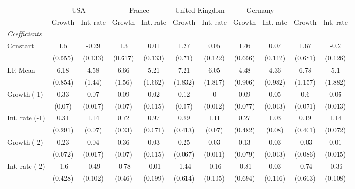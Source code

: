 \begin{table}[htbp] 
	\centering
	 \scriptsize
	\begin{tabular}{@{\extracolsep{4pt}}lcccccccccc@{}}		\hline\hline
		 		 & \multicolumn{2}{c}{USA} &\multicolumn{2}{c}{France} &\multicolumn{2}{c}{United Kingdom} &\multicolumn{2}{c}{Germany} \\ 
 		 & Growth 	 & Int. rate 	 & Growth 	 & Int. rate 	 & Growth 	 & Int. rate 	 & Growth 	 & Int. rate 	 & Growth 	 & Int. rate\\\cline{2-3}\cline{4-5}\cline{6-7}\cline{8-9}\cline{10-11}
\rule{0pt}{4ex} 
 \emph{Coefficients} 	  		 & 		 & 		 & 		 & 		 & 		 & 		 & 		 & 		 & 		 &\\ 
\quad Constant 	 & 1.5 	 & -0.29 	 & 1.3 	 & 0.01 	 & 1.27 	 & 0.05 	 & 1.46 	 & 0.07 	 & 1.67 	 & -0.2	 \\ 
 		 & (0.555) 	 & (0.133) 	 & (0.617) 	 & (0.133) 	 & (0.71) 	 & (0.122) 	 & (0.656) 	 & (0.112) 	 & (0.681) 	 & (0.126) 	 \\ 
\quad LR Mean 	 & 6.18 	 & 4.58 	 & 6.66 	 & 5.21 	 & 7.21 	 & 6.05 	 & 4.48 	 & 4.36 	 & 6.78 	 & 5.1	 \\ 
 		 & (0.854) 	 & (1.44) 	 & (1.56) 	 & (1.662) 	 & (1.832) 	 & (1.817) 	 & (0.906) 	 & (0.982) 	 & (1.157) 	 & (1.882) 	 \\ 
\quad Growth (-1) 	 &0.33 	 & 0.07 	 & 0.09 	 & 0.02 	 & 0.12 	 & 0 	 & 0.09 	 & 0.05 	 & 0.6 	 & 0.06	 \\ 
 		 & (0.07) 	 & (0.017) 	 & (0.07) 	 & (0.015) 	 & (0.07) 	 & (0.012) 	 & (0.077) 	 & (0.013) 	 & (0.071) 	 & (0.013) 	 \\ 
\quad Int. rate (-1) 	 &0.31 	 & 1.14 	 & 0.72 	 & 0.97 	 & 0.89 	 & 1.11 	 & 0.27 	 & 1.03 	 & 0.19 	 & 1.14	 \\ 
 		 & (0.291) 	 & (0.07) 	 & (0.33) 	 & (0.071) 	 & (0.413) 	 & (0.07) 	 & (0.482) 	 & (0.08) 	 & (0.401) 	 & (0.072) 	 \\ 
\quad Growth (-2) 	 &0.23 	 & 0.04 	 & 0.36 	 & 0.03 	 & 0.25 	 & 0.03 	 & 0.13 	 & 0.03 	 & -0.03 	 & 0.01	 \\ 
 		 & (0.072) 	 & (0.017) 	 & (0.07) 	 & (0.015) 	 & (0.067) 	 & (0.011) 	 & (0.079) 	 & (0.013) 	 & (0.086) 	 & (0.015) 	 \\ 
\quad Int. rate (-2) 	 &-1.6 	 & -0.49 	 & -0.78 	 & -0.01 	 & -1.44 	 & -0.16 	 & -0.81 	 & 0.03 	 & -0.74 	 & -0.36	 \\ 
 		 & (0.428) 	 & (0.102) 	 & (0.46) 	 & (0.099) 	 & (0.614) 	 & (0.105) 	 & (0.694) 	 & (0.116) 	 & (0.603) 	 & (0.108) 	 \\ 

\end{tabular}
\end{table}
